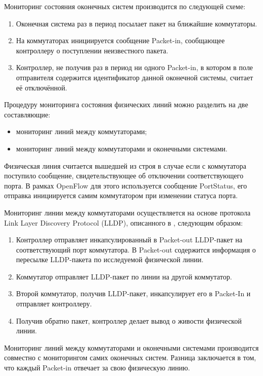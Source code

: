 \documentclass[12pt, a4paper]{article}
\begin{document}
Мониторинг состояния оконечных систем производится по следующей схеме:
\begin{enumerate}
	\item Оконечная система раз в период посылает пакет на ближайшие коммутаторы.
	\item На коммутаторах инициируется сообщение Packet-in, сообщающее контроллеру о поступлении неизвестного пакета.
	\item Контроллер, не получив раз в период ни одного Packet-in, в котором в поле отправителя содержится идентификатор данной оконечной системы, считает её отключённой.
\end{enumerate}


Процедуру мониторинга состояния физических линий можно разделить на две составляющие: 
\begin{itemize}
	\item мониторинг линий между коммутаторами;
	\item мониторинг линий между коммутаторами и оконечными системами.
\end{itemize}

Физическая линия считается вышедшей из строя в случае если с коммутатора поступило сообщение, свидетельствующее об отключении соответствующего порта. В рамках OpenFlow для этого используется сообщение PortStatus, его отправка инициируется самим коммутатором при изменении статуса порта.

Мониторинг линии между коммутаторами осуществляется на основе протокола Link Layer Discovery Protocol (LLDP), описанного в \cite{monitor2}, следующим образом:
\begin{enumerate}
	\item Контроллер отправляет инкапсулированный в Packet-out LLDP-пакет на соответствующий порт коммутатора. В Packet-out содержится информация о пересылке LLDP-пакета по исследуемой физической линии.
	\item Коммутатор отправляет LLDP-пакет по линии на другой коммутатор.
	\item Второй коммутатор, получив LLDP-пакет, инкапсулирует его в Packet-In и отправляет контроллеру.
	\item Получив обратно пакет, контроллер делает вывод о живости физической линии.
\end{enumerate}

Мониторинг линий между коммутаторами и оконечными системами производится совместно с мониторингом самих оконечных систем. Разница заключается в том, что каждый Packet-in отвечает за свою физическую линию.
\end{document}
